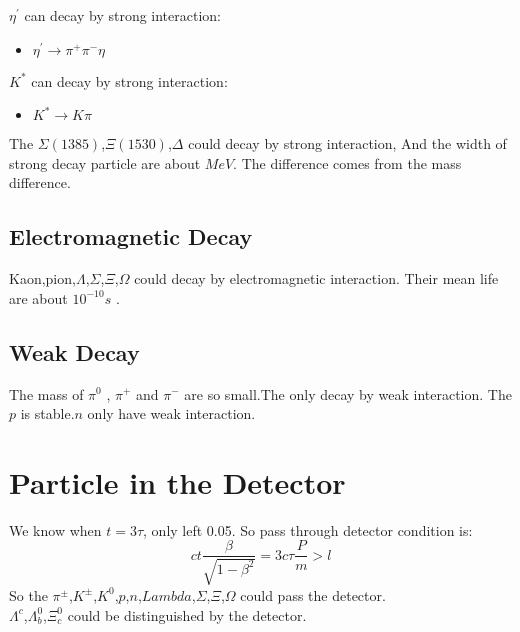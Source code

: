 \documentclass[
10pt, %
a4paper, %
oneside, %
headinclude,footinclude, %
BCOR5mm, %
]{scrartcl}
\begin{document}
$\eta^{'}$ can decay by strong interaction:
\begin{itemize}
\item $\eta^{'}\rightarrow\pi^+\pi^-\eta$
\end{itemize}

$K^{*}$ can decay by strong interaction:
\begin{itemize}
\item $K^{*}\rightarrow K\pi$
\end{itemize}

The $\Sigma(1385)$,$\Xi(1530)$,$\Delta$ could decay by strong interaction, And the width of strong decay particle are about $MeV$. The difference comes from the mass difference.




\subsection{Electromagnetic Decay}
Kaon,\quad pion,\quad$\Lambda$,\quad$\Sigma$,\quad$\Xi$,\quad$\Omega$ could decay by electromagnetic interaction. Their mean life are about $10^{-10}s$ .



\subsection{Weak Decay}
The mass of $\pi^0$ , $\pi^+$ and $\pi^-$ are so small.The only decay by weak interaction.
The $p$ is stable.$n$ only have weak interaction.




\section{Particle in the Detector}
We know when $t=3\tau$, only left 0.05. So pass through detector condition is:
\begin{equation}
ct\frac{\beta}{\sqrt{1-\beta^2}}=3c\tau\frac{P}{m}>l
\end{equation}
So the $\pi^{\pm}$,\quad$K^{\pm}$,\quad$K^0$,\quad$p$,\quad$n$,\quad$Lambda$,\quad$\Sigma$,\quad$\Xi$,\quad$\Omega$ could pass the detector.\\
$\Lambda^c$,\quad$\Lambda^0_b$,\quad$\Xi_c^0$ could be distinguished by the detector.
\end{document}
